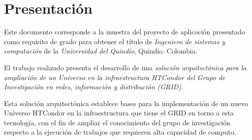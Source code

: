 \part{Presentación}

Este documento corresponde a la muestra del proyecto de aplicación presentado como requisito de grado para obtener el título de \textit{Ingeniero de sistemas y computación} de la \textit{Universidad del Quindío}, Quindío. Colombia.\par

El trabajo realizado presenta el desarrollo de una \textit{solución arquitectónica para la ampliación de un Universo en la infraestructura HTCondor del Grupo de Investigación en redes, información y distribución (GRID)}.\par

Esta solución arquitectónica establece bases para la implementación de un nuevo Universo HTCondor en la infraestructura que tiene el GRID en torno a esta tecnología, con el fin de ampliar el conocimiento del grupo de investigación respecto a la ejecución de trabajos que requieren alta capacidad de computo.

\newpage

\newpage


\newpage


\newpage